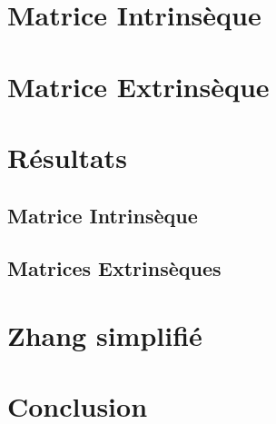 \documentclass[a4paper]{article}
\begin{document}
\section{Matrice Intrinsèque}


\clearpage

\section{Matrice Extrinsèque}


\clearpage

\section{Résultats}

\subsection{Matrice Intrinsèque}

\subsection{Matrices Extrinsèques}


\clearpage

\section{Zhang simplifié}




\clearpage


\section{Conclusion}

\clearpage
\end{document}
